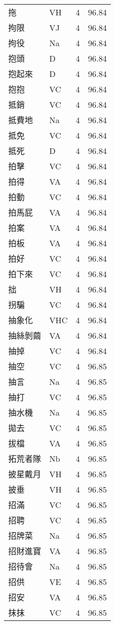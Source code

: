 \documentclass[twocolumn]{book}
\begin{document}
\begin{supertabular}{llrr}
拖 & VH & 4 &  96.84\\
拘限 & VJ & 4 &  96.84\\
拘役 & Na & 4 &  96.84\\
抱頭 & D & 4 &  96.84\\
抱起來 & D & 4 &  96.84\\
抱抱 & VC & 4 &  96.84\\
抵銷 & VC & 4 &  96.84\\
抵費地 & Na & 4 &  96.84\\
抵免 & VC & 4 &  96.84\\
抵死 & D & 4 &  96.84\\
拍擊 & VC & 4 &  96.84\\
拍得 & VA & 4 &  96.84\\
拍動 & VC & 4 &  96.84\\
拍馬屁 & VA & 4 &  96.84\\
拍案 & VA & 4 &  96.84\\
拍板 & VA & 4 &  96.84\\
拍好 & VC & 4 &  96.84\\
拍下來 & VC & 4 &  96.84\\
拙 & VH & 4 &  96.84\\
拐騙 & VC & 4 &  96.84\\
抽象化 & VHC & 4 &  96.84\\
抽絲剝繭 & VA & 4 &  96.84\\
抽掉 & VC & 4 &  96.84\\
抽空 & VC & 4 &  96.85\\
抽言 & Na & 4 &  96.85\\
抽打 & VC & 4 &  96.85\\
抽水機 & Na & 4 &  96.85\\
拋去 & VC & 4 &  96.85\\
拔檔 & VA & 4 &  96.85\\
拓荒者隊 & Nb & 4 &  96.85\\
披星戴月 & VH & 4 &  96.85\\
披垂 & VH & 4 &  96.85\\
招滿 & VC & 4 &  96.85\\
招聘 & VC & 4 &  96.85\\
招牌菜 & Na & 4 &  96.85\\
招財進寶 & VA & 4 &  96.85\\
招待會 & Na & 4 &  96.85\\
招供 & VE & 4 &  96.85\\
招安 & VA & 4 &  96.85\\
抹抹 & VC & 4 &  96.85\\

\end{supertabular}
\end{document}
